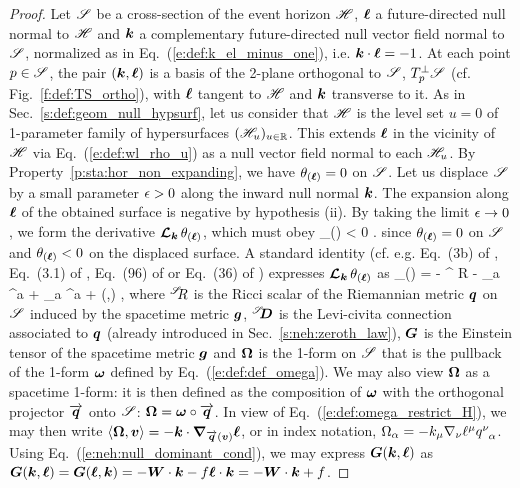 \begin{proof}
Let $\mathscr{S}$ be a cross-section of the event horizon $\mathscr{H}$,
$\bm{\ell}$ a future-directed null normal to $\mathscr{H}$ and $\bm{k}$ a complementary
future-directed null vector field
normal to $\mathscr{S}$, normalized as in Eq.~(\ref{e:def:k_el_minus_one}), i.e.
$\bm{k}\cdot\bm{\ell} = -1$. At each point $p\in \mathscr{S}$, the pair $(\bm{k},\bm{\ell})$ is
a basis of the 2-plane orthogonal to $\mathscr{S}$, $T_p^\perp\mathscr{S}$ (cf. Fig.~\ref{f:def:TS_ortho}),
with $\bm{\ell}$ tangent to $\mathscr{H}$ and $\bm{k}$ transverse to it.
As in Sec.~\ref{s:def:geom_null_hypsurf}, let us consider that $\mathscr{H}$
is the level set $u=0$ of 1-parameter family of hypersurfaces $(\mathscr{H}_u)_{u\in\mathbb{R}}$.
This extends $\bm{\ell}$ in the vicinity of $\mathscr{H}$ via Eq.~(\ref{e:def:wl_rho_u})
as a null vector field normal to each $\mathscr{H}_u$.
By Property~\ref{p:sta:hor_non_expanding}, we have $\theta_{(\bm{\ell})} = 0$
on $\mathscr{S}$. Let us displace $\mathscr{S}$ by a small parameter $\epsilon>0$ along the inward
null normal $\bm{k}$. The expansion along $\bm{\ell}$ of the obtained surface is
negative by hypothesis (ii). By taking the limit $\epsilon\to 0$, we form the
derivative $\bm{\mathcal{L}}_{\bm{k}}\, \theta_{(\bm{\ell})}$, which must obey
\be \label{e:sta:Lie_k_l}
     \theta_{(\wl)} < 0 .
\ee
since $\theta_{(\bm{\ell})} = 0$ on $\mathscr{S}$ and
$\theta_{(\bm{\ell})} < 0$ on the displaced surface.
A standard identity (cf. e.g. Eq.~(3b) of \cite{Haywa94}, Eq.~(3.1) of \cite{BoothF07},
Eq.~(96) of \cite{Cao11} or Eq.~(36) of \cite{Jaram13})
expresses $\bm{\mathcal{L}}_{\bm{k}}\,\theta_{(\bm{\ell})}$ as
\be \label{e:sta:Lie_k_theta_l}
     \theta_{(\wl)} = -  {}^\Sp\!\! R - \DSc_a \Omega^a
    +  \Omega_a \Omega^a + (,\wl) ,
\ee
where ${}^{\mathscr{S}}\!\! R$ is the Ricci scalar of the Riemannian metric $\bm{q}$ on
$\mathscr{S}$ induced by the spacetime metric $\bm{g}$, ${}^{\mathscr{S}}\!\!\bm{D}$ is the Levi-civita
connection associated to $\bm{q}$ (already introduced in Sec.~\ref{s:neh:zeroth_law}),
$\bm{G}$ is the Einstein tensor
of the spacetime metric $\bm{g}$ and $\bm{\Omega}$ is the 1-form on $\mathscr{S}$
that is the pullback of the 1-form $\bm{\omega}$ defined by Eq.~(\ref{e:def:def_omega}).
We may also view $\bm{\Omega}$ as a spacetime 1-form: it is then defined as
the composition of $\bm{\omega}$ with the orthogonal projector $\overrightarrow{\bm{q}}$ onto
$\mathscr{S}$: $\bm{\Omega} = \bm{\omega} \circ \overrightarrow{\bm{q}}$.
In view of Eq.~(\ref{e:def:omega_restrict_H}), we may then write
$\langle\bm{\Omega}, \bm{v} \rangle = - \bm{k} \cdot\bm{\nabla}_{\overrightarrow{\bm{q}}(\bm{v})} \bm{\ell}$,
or in index notation, $\Omega_\alpha  = - k_\mu \nabla_\nu \ell^\mu q^\nu_{\ \, \alpha}$.
Using Eq.~(\ref{e:neh:null_dominant_cond}), we may express $\bm{G}(\bm{k},\bm{\ell})$
as $\bm{G}(\bm{k},\bm{\ell}) = \bm{G}(\bm{\ell}, \bm{k}) = - \bm{W}\cdot\bm{k} - f \bm{\ell}\cdot \bm{k} = - \bm{W}\cdot\bm{k} + f$.

\end{proof}
